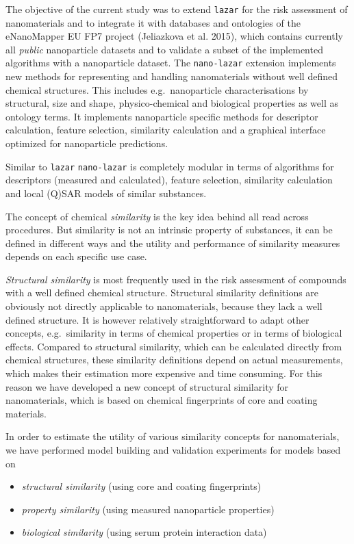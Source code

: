 \documentclass[utf8]{frontiersHLTH} %
\providecommand{\tightlist}{%
  \setlength{\itemsep}{0pt}\setlength{\parskip}{0pt}}
\begin{document}
The objective of the current study was to extend \texttt{lazar} for the
risk assessment of nanomaterials and to integrate it with databases and
ontologies of the eNanoMapper EU FP7 project (Jeliazkova et al. 2015),
which contains currently all \emph{public} nanoparticle datasets and to
validate a subset of the implemented algorithms with a nanoparticle
dataset. The \texttt{nano-lazar} extension implements new methods for
representing and handling nanomaterials without well defined chemical
structures. This includes e.g.~nanoparticle characterisations by
structural, size and shape, physico-chemical and biological properties
as well as ontology terms. It implements nanoparticle specific methods
for descriptor calculation, feature selection, similarity calculation
and a graphical interface optimized for nanoparticle predictions.

Similar to \texttt{lazar} \texttt{nano-lazar} is completely modular in
terms of algorithms for descriptors (measured and calculated), feature
selection, similarity calculation and local (Q)SAR models of similar
substances.

The concept of chemical \emph{similarity} is the key idea behind all
read across procedures. But similarity is not an intrinsic property of
substances, it can be defined in different ways and the utility and
performance of similarity measures depends on each specific use case.

\emph{Structural similarity} is most frequently used in the risk
assessment of compounds with a well defined chemical structure.
Structural similarity definitions are obviously not directly applicable
to nanomaterials, because they lack a well defined structure. It is
however relatively straightforward to adapt other concepts,
e.g.~similarity in terms of chemical properties or in terms of
biological effects. Compared to structural similarity, which can be
calculated directly from chemical structures, these similarity
definitions depend on actual measurements, which makes their estimation
more expensive and time consuming. For this reason we have developed a
new concept of structural similarity for nanomaterials, which is based
on chemical fingerprints of core and coating materials.

In order to estimate the utility of various similarity concepts for
nanomaterials, we have performed model building and validation
experiments for models based on

\begin{itemize}
\tightlist
\item
  \emph{structural similarity} (using core and coating fingerprints)
\item
  \emph{property similarity} (using measured nanoparticle properties)
\item
  \emph{biological similarity} (using serum protein interaction data)
\end{itemize}
\end{document}
